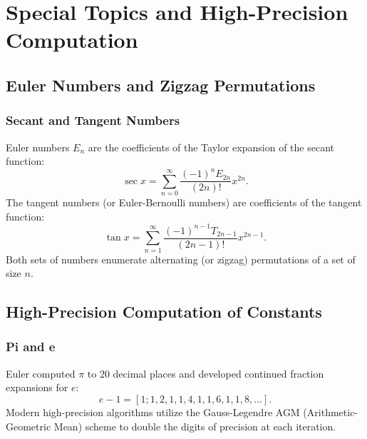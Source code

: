 \documentclass[11pt,a4paper,twoside]{book}
\theoremstyle{eulerstyle}
\theoremstyle{definition}
\begin{document}
\cleardoublepage

\part{Special Topics and High-Precision Computation}
\label{part:special_topics}

\chapter{Euler Numbers and Zigzag Permutations}
\label{ch:euler_numbers}

\section{Secant and Tangent Numbers}
Euler numbers $E_n$ are the coefficients of the Taylor expansion of the secant function:
\[
\sec x = \sum_{n=0}^\infty \frac{(-1)^n E_{2n}}{(2n)!} x^{2n}.
\]
The tangent numbers (or Euler-Bernoulli numbers) are coefficients of the tangent function:
\[
\tan x = \sum_{n=1}^\infty \frac{(-1)^{n-1} T_{2n-1}}{(2n-1)!} x^{2n-1}.
\]
Both sets of numbers enumerate alternating (or zigzag) permutations of a set of size $n$.

\cleardoublepage

\chapter{High-Precision Computation of Constants}
\label{ch:high_precision}

\section{Pi and e}
Euler computed $\pi$ to 20 decimal places and developed continued fraction expansions for $e$:
\[
e - 1 = [1; 1, 2, 1, 1, 4, 1, 1, 6, 1, 1, 8, \dots].
\]
Modern high-precision algorithms utilize the Gauss-Legendre AGM (Arithmetic-Geometric Mean) scheme to double the digits of precision at each iteration.
\end{document}
